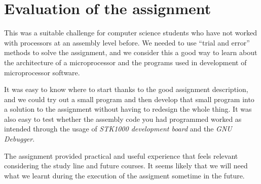 \section{Evaluation of the assignment}

This was a suitable challenge for computer science students who have not
worked with processors at an assembly level before. We needed to use
``trial and error'' methods to solve the assignment, and we consider
this a good way to learn about the architecture of a microprocessor and
the programs used in development of microprocessor software.

It was easy to know where to start thanks to the good assignment
description, and we could try out a small program and then develop that
small program into a solution to the assignment without having to
redesign the whole thing. It was also easy to test whether the assembly
code you had programmed worked as intended through the usage of {\em
STK1000 development board} and the {\em GNU Debugger}.

The assignment provided practical and useful experience that feels
relevant considering the study line and future courses. It seems likely
that we will need what we learnt during the execution of the assigment
sometime in the future.

\begin{comment}
Writing such a thorough report is a relatively new activity for the
members of our group, so we were a little uncertain as to how thorough
the report was supposed to be. An example report for some assignment in
the same field would useful, so that we would know whether we're doing
it right or not. The approximate expected report length could also have
been specified.
\end{comment}
